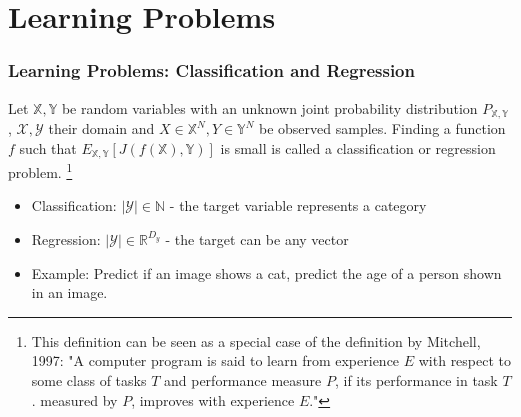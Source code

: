 \section{Learning Problems} %

\begin{frame}
\frametitle{Learning Problems: Classification and Regression}

\begin{definition}
    Let $\mathbb{X}, \mathbb{Y}$ be random variables with an unknown joint probability distribution $P_{\mathbb{X}, \mathbb{Y}}$, $\mathcal{X}, \mathcal{Y}$ their domain and $X \in \mathbb{X}^N, Y \in \mathbb{Y}^N$ be observed samples. Finding a function $f$ such that $E_{\mathbb{X}, \mathbb{Y}}[J(f(\mathbb{X}), \mathbb{Y})]$ is small is called a classification or regression problem. \footnote{
        This definition can be seen as a special case of the definition by Mitchell, 1997: "A computer program is said to learn from experience $E$ with respect to some class of tasks $T$ and performance measure $P$, if its performance in task $T$. measured by $P$, improves with experience $E$."
    }
\end{definition}

\begin{itemize}
    \item Classification: $|\mathcal{Y}| \in \mathbb{N}$ - the target variable represents a category
    \item Regression: $|\mathcal{Y}| \in \mathbb{R}^{D_y}$ - the target can be any vector
    \item Example: Predict if an image shows a cat, predict the age of a person shown in an image.
\end{itemize}


\end{frame}